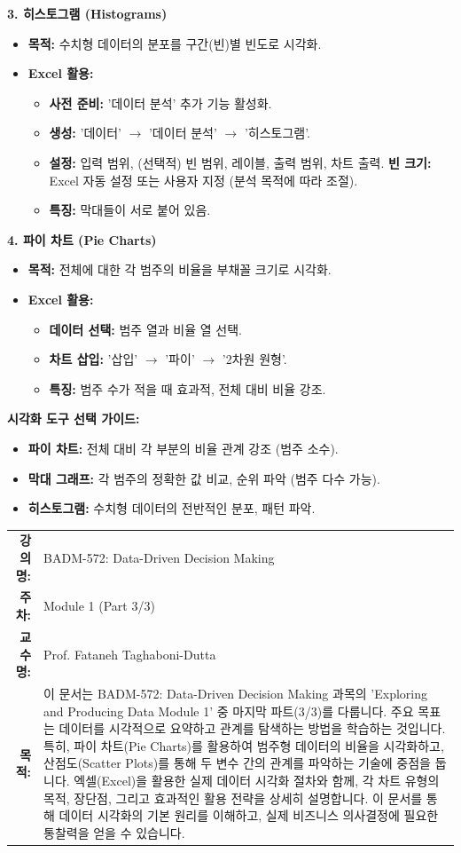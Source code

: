 \documentclass[11pt,a4paper]{book}
\makeatletter
\theoremstyle{definition}
\newcommand{\metainfo}[4]{
\begin{tcolorbox}[
    colback=lightpurple,
    colframe=darkpurple,
    boxrule=1pt,
    arc=2mm,
    left=10pt,
    right=10pt,
    top=8pt,
    bottom=8pt
]
\begin{tabular}{@{}rl@{}}
\textbf{강의명:} & #1 \\[0.3em]
\textbf{주차:} & #2 \\[0.3em]
\textbf{교수명:} & #3 \\[0.3em]
\textbf{목적:} & \begin{minipage}[t]{0.75\textwidth}#4\end{minipage}
\end{tabular}
\end{tcolorbox}
}
\makeatother
\begin{document}
\begin{tcolorbox}[colback=lightblue,colframe=darkblue,title={\textbf{데이터 요약 및 시각화 핵심 도구}}]
\textbf{3. 히스토그램 (Histograms)}
\begin{itemize}
    \item \textbf{목적:} 수치형 데이터의 분포를 구간(빈)별 빈도로 시각화.
    \item \textbf{Excel 활용:}
    \begin{itemize}
        \item \textbf{사전 준비:} '데이터 분석' 추가 기능 활성화.
        \item \textbf{생성:} '데이터' $\rightarrow$ '데이터 분석' $\rightarrow$ '히스토그램'.
        \item \textbf{설정:} 입력 범위, (선택적) 빈 범위, 레이블, 출력 범위, 차트 출력.
        \textbf{빈 크기:} Excel 자동 설정 또는 사용자 지정 (분석 목적에 따라 조절).
        \item \textbf{특징:} 막대들이 서로 붙어 있음.
    \end{itemize}
\end{itemize}

\textbf{4. 파이 차트 (Pie Charts)}
\begin{itemize}
    \item \textbf{목적:} 전체에 대한 각 범주의 비율을 부채꼴 크기로 시각화.
    \item \textbf{Excel 활용:}
    \begin{itemize}
        \item \textbf{데이터 선택:} 범주 열과 비율 열 선택.
        \item \textbf{차트 삽입:} '삽입' $\rightarrow$ '파이' $\rightarrow$ '2차원 원형'.
        \item \textbf{특징:} 범주 수가 적을 때 효과적, 전체 대비 비율 강조.
    \end{itemize}
\end{itemize}

\textbf{시각화 도구 선택 가이드:}
\begin{itemize}
    \item \textbf{파이 차트:} 전체 대비 각 부분의 비율 관계 강조 (범주 소수).
    \item \textbf{막대 그래프:} 각 범주의 정확한 값 비교, 순위 파악 (범주 다수 가능).
    \item \textbf{히스토그램:} 수치형 데이터의 전반적인 분포, 패턴 파악.
\end{itemize}
\end{tcolorbox}


\metainfo{BADM-572: Data-Driven Decision Making}{Module 1 (Part 3/3)}{Prof. Fataneh Taghaboni-Dutta}{이 문서는 BADM-572: Data-Driven Decision Making 과목의 'Exploring and Producing Data Module 1' 중 마지막 파트(3/3)를 다룹니다. 주요 목표는 데이터를 시각적으로 요약하고 관계를 탐색하는 방법을 학습하는 것입니다. 특히, 파이 차트(Pie Charts)를 활용하여 범주형 데이터의 비율을 시각화하고, 산점도(Scatter Plots)를 통해 두 변수 간의 관계를 파악하는 기술에 중점을 둡니다. 엑셀(Excel)을 활용한 실제 데이터 시각화 절차와 함께, 각 차트 유형의 목적, 장단점, 그리고 효과적인 활용 전략을 상세히 설명합니다. 이 문서를 통해 데이터 시각화의 기본 원리를 이해하고, 실제 비즈니스 의사결정에 필요한 통찰력을 얻을 수 있습니다.}
\end{document}
